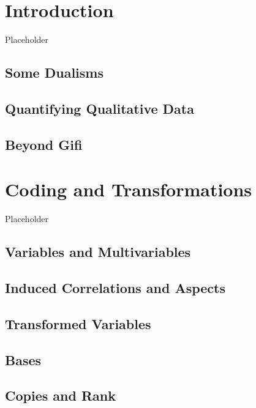 \documentclass[
  12pt,
]{book}
\begin{document}
\chapter{Introduction}\label{introduction}

Placeholder

\section{Some Dualisms}\label{some-dualisms}

\section{Quantifying Qualitative Data}\label{quantifying-qualitative-data}

\section{Beyond Gifi}\label{beyond-gifi}

\chapter{Coding and Transformations}\label{coding-and-transformations}

Placeholder

\section{Variables and Multivariables}\label{variables-and-multivariables}

\section{Induced Correlations and Aspects}\label{induced-correlations-and-aspects}

\section{Transformed Variables}\label{transformed-variables}

\section{Bases}\label{bases}

\section{Copies and Rank}\label{copies-and-rank}
\end{document}
